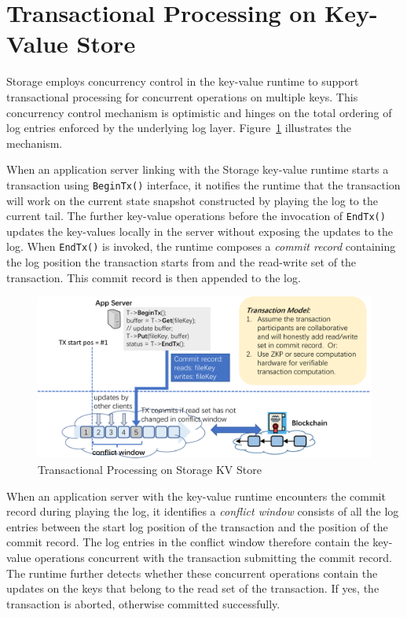 \section{Transactional Processing on Key-Value Store}

\projabbrev Storage employs concurrency control in the key-value runtime to support transactional processing for concurrent operations on multiple keys. 
This concurrency control mechanism is optimistic and hinges on the total ordering of log entries enforced by the underlying log layer. 
Figure~\ref{fig:tx} illustrates the mechanism.

When an application server linking with the \projabbrev Storage key-value runtime starts a transaction using \texttt{BeginTx()} interface, it notifies the runtime that the transaction will work on the current state snapshot constructed by playing the log to the current tail.
The further key-value operations before the invocation of \texttt{EndTx()} updates the key-values locally in the server without exposing the updates to the log. 
When \texttt{EndTx()} is invoked, the runtime composes a \emph{commit record} containing the log position the transaction starts from and the read-write set of the transaction.  
This commit record is then appended to the log.

\begin{figure}[H]	
	\includegraphics[width=\textwidth]{figure/tx-crop.pdf}
	\caption{Transactional Processing on \projabbrev Storage KV Store}
	\label{fig:tx}
\end{figure}
 
When an application server with the key-value runtime encounters the commit record during playing the log, it identifies a \emph{conflict window} consists of all the log entries between the start log position of the transaction and the position of the commit record. 
The log entries in the conflict window therefore contain the key-value operations concurrent with the transaction submitting the commit record. 
The runtime further detects whether these concurrent operations contain the updates on the keys that belong to the read set of the transaction.
If yes, the transaction is aborted, otherwise committed successfully.

